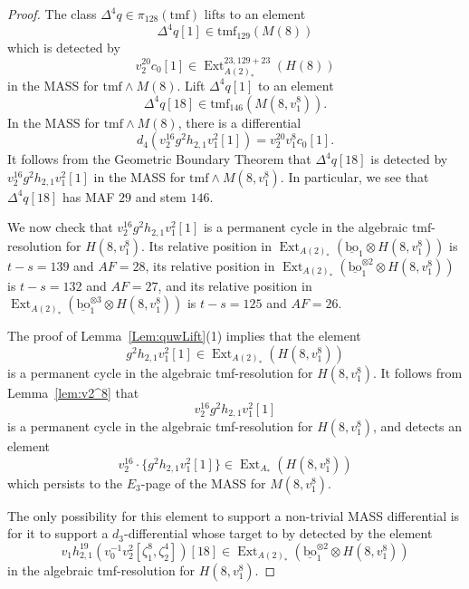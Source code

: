 \documentclass[10pt]{amsart}
\newcommand{\ul}[1]{\underline{#1}}
\newcommand{\tmf}{\mathrm{tmf}}
\newcommand{\bo}{\mathrm{bo}}
\newcommand{\bou}{\ul{\bo}}
\theoremstyle{definition}
\numberwithin{equation}{section}
\numberwithin{figure}{section}
\DeclareMathOperator{\Ext}{Ext}
\begin{document}
\begin{proof}
The class $\Delta^4 q \in \pi_{128}(\tmf)$ lifts to an element
$$\Delta^4 q [1] \in \tmf_{129}(M(8))$$
which is detected by 
$$v_2^{20} c_0[1] \in \Ext^{23, 129+23}_{A(2)_*}(H(8))$$ 
in the MASS for $\tmf \wedge M(8)$. Lift $\Delta^4 q[1]$ to an element 
$$\Delta^4 q[18] \in \tmf_{146}(M(8,v_1^8)).$$ 
In the MASS for $\tmf \wedge M(8)$, there is a differential 
$$d_4(v_2^{16} g^2 h_{2,1} v_1^2[1]) = v_2^{20}v_1^8c_0[1].$$ 
It follows from the Geometric Boundary Theorem that $\Delta^4 q[18]$ is detected by $v_2^{16} g^2 h_{2,1} v_1^2[1]$ in the MASS for $\tmf \wedge M(8,v_1^8)$. In particular, we see that $\Delta^4 q[18]$ has MAF $29$ and stem $146$. 

We now check that $v_2^{16} g^2 h_{2,1} v_1^2[1]$ is a permanent cycle in the algebraic $\tmf$-resolution for $H(8,v_1^8)$. Its relative position in $\Ext_{A(2)_*}(\bou_1 \otimes H(8,v_1^8))$ is $t-s = 139$ and $AF = 28$, its relative position in $\Ext_{A(2)_*}(\bou_1^{\otimes 2} \otimes H(8,v_1^8))$ is $t-s = 132$ and $AF = 27$, and its relative position in $\Ext_{A(2)_*}(\bou_1^{\otimes 3} \otimes H(8,v_1^8))$ is $t-s = 125$ and $AF = 26$. 

The proof of Lemma~\ref{Lem:quwLift}(1) implies that the element 
$$ g^2 h_{2,1} v_1^2[1] \in \Ext_{A(2)_*}(H(8,v_1^8)) $$
is a permanent cycle in the algebraic tmf-resolution for $H(8,v_1^8)$.  It follows from Lemma~\ref{lem:v2^8} that 
$$ v_2^{16} g^2 h_{2,1} v_1^2[1] $$
is a permanent cycle in the algebraic tmf-resolution for $H(8,v_1^8)$, and detects an element 
$$ v_2^{16} \cdot \{ g^2 h_{2,1} v_1^2[1] \} \in \Ext_{A_*}(H(8,v_1^8)) $$
which persists to the $E_3$-page of the MASS for $M(8,v_1^8)$.

The only possibility for this element to support a non-trivial MASS differential is for it to support a $d_3$-differential whose target to by detected by the element
$$ {v_1 h_{2,1}^{19}(v_0^{-1}v_2^2[\zeta_1^8,\zeta_2^4])[18]} \in \Ext_{A(2)_*}(\bou_1^{\otimes 2} \otimes H(8,v_1^8)) $$
in the algebraic tmf-resolution for $H(8,v_1^8)$.


\end{proof}
\end{document}
